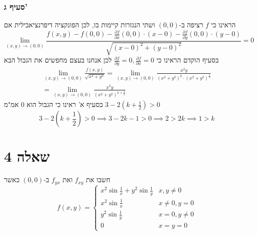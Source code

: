 \documentclass[12pt, titlepage]{article}
\begin{document}
\section*{סעיף ג'}
הראינו כי $f$ רציפה ב-$\left(0,0\right)$ ושתי הנגזרות קיימות בו, לכן הפונקציה דיפרנציאבילית אם
\[
    \lim_{\left(x,y\right) \to \left(0,0\right)} \frac{f\left(x,y\right) -f\left(0,0\right) - \frac{\partial f}{\partial x} \left(0,0\right) \cdot \left(x-0\right) - \frac{\partial f}{\partial y} \left(0,0\right) \cdot \left(y-0\right)}{\sqrt{\left(x-0\right)^2 + \left(y-0\right)^2}} = 0
\]
בסעיף הוקדם הראינו כי $\frac{\partial f}{\partial y} = 0, \frac{\partial f}{\partial x} = 0$
לכן אנחנו בעצם מחפשים את הגבול הבא
\begin{gather*}
    \lim_{\left(x,y\right) \to \left(0,0\right)} \frac{f\left(x,y\right)}{\sqrt{x^2 +y^2}} = \lim_{\left(x,y\right) \to \left(0,0\right)} \frac{x^2y}{\left(x^2+y^2\right)^k\cdot \left(x^2+y^2\right)^{\frac{1}{2}}} \\
    = \lim_{\left(x,y\right) \to \left(0,0\right)} \frac{x^2y}{\left(x^2+y^2\right)^{k+ \frac{1}{2}}}
\end{gather*}
בסעיף א' ראינו כי הגבול הוא $0$ אמ"מ $3-2\left(k+\frac{1}{2}\right)>0$
\[
3-2\left(k+\frac{1}{2}\right) > 0 \implies 3 -2k-1 > 0 \implies 2 > 2k \implies  \boxed{1 > k}
\]
\newpage
\part*{שאלה 4}
חשבו את $f_{xy}$ ואת $f_{yx}$ ב-$\left(0,0\right)$ כאשר
\[
    f(x,y) = \begin{cases}
        x^2 \sin \frac{1}{x} + y^2 \sin \frac{1}{y} & x,y \neq 0\\
        x^2 \sin \frac{1}{x} & x \neq 0 ,y = 0\\
        y^2 \sin \frac{1}{y} & x = 0, y \neq 0\\
        0 & x=y=0
    \end{cases}
\]
\end{document}
